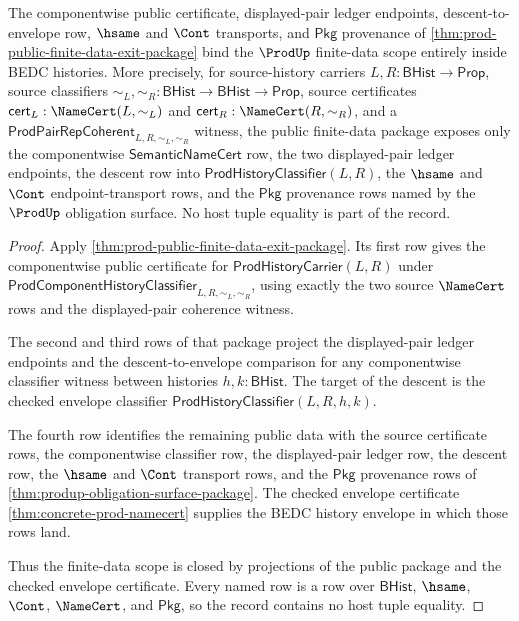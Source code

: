 \begin{theorem}
\label{thm:prod-finite-data-scoped-closure-record}
The componentwise public certificate, displayed-pair ledger endpoints,
descent-to-envelope row, $\hsame$ and $\Cont$ transports, and $\mathsf{Pkg}$
provenance of \autoref{thm:prod-public-finite-data-exit-package} bind the
$\ProdUp$ finite-data scope entirely inside BEDC histories. More precisely,
for source-history carriers $L,R:\mathsf{BHist}\to\mathsf{Prop}$, source
classifiers $\sim_L,\sim_R:\mathsf{BHist}\to\mathsf{BHist}\to\mathsf{Prop}$,
source certificates $\mathsf{cert}_L:\NameCert(L,\sim_L)$ and
$\mathsf{cert}_R:\NameCert(R,\sim_R)$, and a
$\mathsf{ProdPairRepCoherent}_{L,R,\sim_L,\sim_R}$ witness, the public
finite-data package exposes only the componentwise
$\mathsf{SemanticNameCert}$ row, the two displayed-pair ledger endpoints, the
descent row into $\mathsf{ProdHistoryClassifier}(L,R)$, the $\hsame$ and
$\Cont$ endpoint-transport rows, and the $\mathsf{Pkg}$ provenance rows named
by the $\ProdUp$ obligation surface. No host tuple equality is part of the
record.
\end{theorem}
\begin{proof}
Apply \autoref{thm:prod-public-finite-data-exit-package}. Its first row gives
the componentwise public certificate for
$\mathsf{ProdHistoryCarrier}(L,R)$ under
$\mathsf{ProdComponentHistoryClassifier}_{L,R,\sim_L,\sim_R}$, using exactly
the two source $\NameCert$ rows and the displayed-pair coherence witness.

The second and third rows of that package project the displayed-pair ledger
endpoints and the descent-to-envelope comparison for any componentwise
classifier witness between histories $h,k:\mathsf{BHist}$. The target of the
descent is the checked envelope classifier
$\mathsf{ProdHistoryClassifier}(L,R,h,k)$.

The fourth row identifies the remaining public data with the source
certificate rows, the componentwise classifier row, the displayed-pair ledger
row, the descent row, the $\hsame$ and $\Cont$ transport rows, and the
$\mathsf{Pkg}$ provenance rows of
\autoref{thm:produp-obligation-surface-package}. The checked envelope
certificate \autoref{thm:concrete-prod-namecert} supplies the BEDC history
envelope in which those rows land.

Thus the finite-data scope is closed by projections of the public package and
the checked envelope certificate. Every named row is a row over
$\mathsf{BHist}$, $\hsame$, $\Cont$, $\NameCert$, and $\mathsf{Pkg}$, so the
record contains no host tuple equality.
\end{proof}

